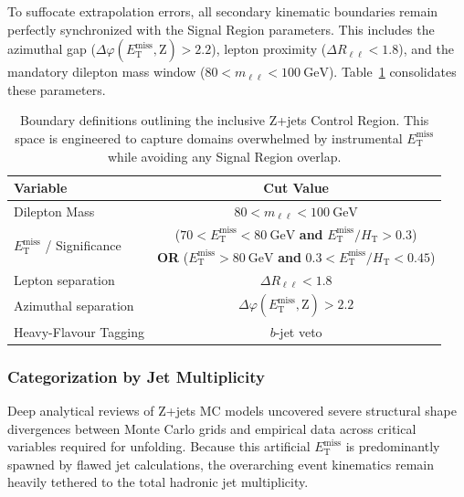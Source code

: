 To suffocate extrapolation errors, all secondary kinematic boundaries remain perfectly synchronized with the Signal Region parameters. This includes the azimuthal gap ($\Delta \varphi(E_{\text{T}}^{\text{miss}}, \text{Z}) > 2.2$), lepton proximity ($\Delta R_{\ell\ell} < 1.8$), and the mandatory dilepton mass window ($80 < m_{\ell\ell} < 100~\text{GeV}$). Table~\ref{table:Zjets_definition} consolidates these parameters.

\begin{table}[!htbp]
\centering
\begin{tabular}{|l|c|}
\hline
\textbf{Variable} & \textbf{Cut Value} \\ 
\hline 
Dilepton Mass & $80 < m_{\ell\ell} < 100~\text{GeV}$ \\
\hline 
\multirow{2}{*}{$E_{\text{T}}^{\text{miss}}$ / Significance} & ($70 < E_{\text{T}}^{\text{miss}} < 80~\text{GeV}$ \textbf{and} $E_{\text{T}}^{\text{miss}} / H_{\text{T}} > 0.3$) \\
& \textbf{OR} ($E_{\text{T}}^{\text{miss}} > 80~\text{GeV}$ \textbf{and} $0.3 < E_{\text{T}}^{\text{miss}} / H_{\text{T}} < 0.45$) \\
\hline 
Lepton separation & $\Delta R_{\ell\ell} < 1.8$ \\ 
\hline 
Azimuthal separation & $\Delta \varphi(E_{\text{T}}^{\text{miss}}, \text{Z}) > 2.2 $ \\
\hline 
Heavy-Flavour Tagging & $b$-jet veto \\
\hline
\end{tabular}
\caption{Boundary definitions outlining the inclusive $\text{Z}$+jets Control Region. This space is engineered to capture domains overwhelmed by instrumental $E_{\text{T}}^{\text{miss}}$ while avoiding any Signal Region overlap.}
\label{table:Zjets_definition}
\end{table}

\subsubsection{Categorization by Jet Multiplicity}

Deep analytical reviews of $\text{Z}$+jets MC models uncovered severe structural shape divergences between Monte Carlo grids and empirical data across critical variables required for unfolding. Because this artificial $E_{\text{T}}^{\text{miss}}$ is predominantly spawned by flawed jet calculations, the overarching event kinematics remain heavily tethered to the total hadronic jet multiplicity. 

